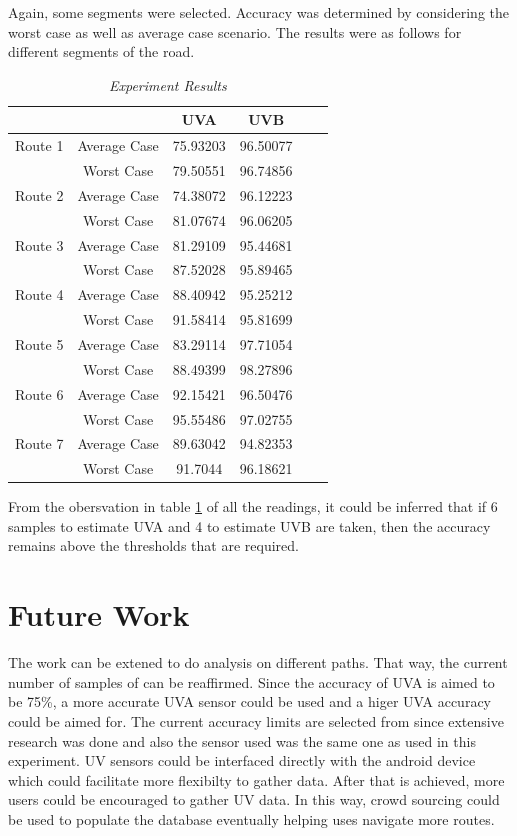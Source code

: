 \documentclass[12pt,fullpage,doublespace]{article}
\begin{document}
Again, some segments were selected. Accuracy was determined by considering the worst case as well as average case scenario. The results were as follows for different segments of the road. \\
\newpage
\begin{table}[h]
\centering
\begin{tabular}{|c|c|c|c|c|c|}
\hline
&&UVA & UVB \\ 
\hline
Route 1 & Average Case & 75.93203 & 96.50077 \\\cline{2-4}
&  Worst Case & 79.50551 &  96.74856\\\cline{2-4}
\hline 
Route 2 & Average Case & 74.38072 & 96.12223 \\\cline{2-4}
&  Worst Case & 81.07674 &  96.06205\\\cline{2-4}
\hline 
Route 3 & Average Case & 81.29109 & 95.44681 \\\cline{2-4}
&  Worst Case & 87.52028 &  95.89465\\\cline{2-4}
\hline 
Route 4 & Average Case & 88.40942 & 95.25212 \\\cline{2-4}
&  Worst Case & 91.58414 &  95.81699\\\cline{2-4}
\hline 
Route 5 & Average Case & 83.29114 &  97.71054 \\\cline{2-4}
&  Worst Case & 88.49399 &  98.27896\\\cline{2-4}
\hline 
Route 6 & Average Case & 92.15421 & 96.50476 \\\cline{2-4}
&  Worst Case & 95.55486 &  97.02755\\\cline{2-4}
\hline 
Route 7 & Average Case & 89.63042 & 94.82353 \\\cline{2-4}
&  Worst Case & 91.7044 &  96.18621\\\cline{2-4}
\hline 

\end{tabular}
\caption{\small \sl Experiment Results}\label{exp}
\end{table}

From the obersvation in table \ref{exp} of all the readings, it could be inferred that if 6 samples to estimate UVA and 4 to estimate UVB are taken, then the accuracy remains above the thresholds that are required.
\newpage

\section{Future Work}
The work can be extened to do analysis on different paths. That way, the current number of samples of can be reaffirmed. Since the accuracy of UVA is aimed to be 75\%, a more accurate UVA sensor could be used and a higer UVA accuracy could be aimed for. The current accuracy limits are selected from \cite{uvguardian} since extensive research was done and also the sensor used was the same one as used in this experiment. UV sensors could be interfaced directly with the android device which could facilitate more flexibilty to gather data. After that is achieved, more users could be encouraged to gather UV data. In this way, crowd sourcing could be used to populate the database eventually helping uses navigate more routes.
\newpage
\end{document}
